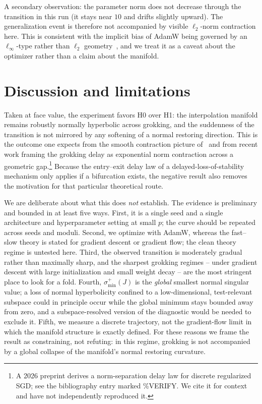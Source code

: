 \documentclass[11pt]{article}
\newcommand{\sminp}{\sigma_{\min}^{+}}
\begin{document}
A secondary observation: the parameter norm does not decrease through the
transition in this run (it stays near $10$ and drifts slightly upward). The
generalization event is therefore not accompanied by visible $\ell_2$-norm
contraction here. This is consistent with the implicit bias of AdamW being
governed by an $\ell_\infty$-type rather than $\ell_2$ geometry~\cite{xie2024,
gronich2026}, and we treat it as a caveat about the optimizer rather than a
claim about the manifold.

\section{Discussion and limitations}
Taken at face value, the experiment favors H0 over H1: the interpolation
manifold remains robustly normally hyperbolic across grokking, and the
suddenness of the transition is not mirrored by any softening of a normal
restoring direction. This is the outcome one expects from the smooth
contraction picture of~\cite{musat2025,boursier2025,lyu2024} and from recent
work framing the grokking delay as exponential norm contraction across a
geometric gap.\footnote{A 2026 preprint derives a norm-separation delay law for
discrete regularized SGD; see the bibliography entry marked \%VERIFY. We cite
it for context and have not independently reproduced it.} Because the
entry--exit delay law of a delayed-loss-of-stability mechanism only applies if
a bifurcation exists, the negative result also removes the motivation for that
particular theoretical route.

We are deliberate about what this does \emph{not} establish. The evidence is
preliminary and bounded in at least five ways. First, it is a single seed and
a single architecture and hyperparameter setting at small $p$; the curve should
be repeated across seeds and moduli. Second, we optimize with AdamW, whereas
the fast--slow theory is stated for gradient descent or gradient flow; the
clean theory regime is untested here. Third, the observed transition is
moderately gradual rather than maximally sharp, and the sharpest grokking
regimes -- under gradient descent with large initialization and small weight
decay -- are the most stringent place to look for a fold. Fourth, $\sminp(J)$
is the \emph{global} smallest normal singular value; a loss of normal
hyperbolicity confined to a low-dimensional, test-relevant subspace could in
principle occur while the global minimum stays bounded away from zero, and a
subspace-resolved version of the diagnostic would be needed to exclude it.
Fifth, we measure a discrete trajectory, not the gradient-flow limit in which
the manifold structure is exactly defined. For these reasons we frame the
result as constraining, not refuting: in this regime, grokking is not
accompanied by a global collapse of the manifold's normal restoring curvature.
\end{document}
